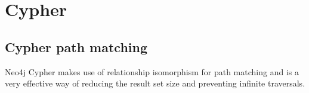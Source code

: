 \chapter{Cypher}
\section{Cypher path matching}
Neo4j Cypher makes use of relationship isomorphism for path matching and is a very effective way of reducing the result set size and preventing infinite traversals.